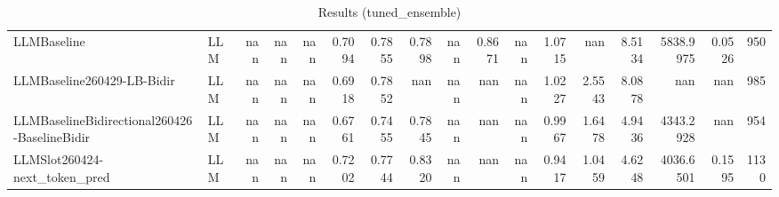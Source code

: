 \begin{table}[htbp]
{\begin{tabular}{ll|rrrrrrrrrrrrrr|r}
LLMBaseline & LLM & nan & nan & nan & 0.7094 & 0.7855 & 0.7898 & nan & 0.8671 & nan & 1.0715 & nan & 8.5134 & 5838.9975 & 0.0526 & 950 \\
LLMBaseline260429-LB-Bidir & LLM & nan & nan & nan & 0.6918 & 0.7852 & nan & nan & nan & nan & 1.0227 & 2.5543 & 8.0878 & nan & nan & 985 \\
LLMBaselineBidirectional260426-BaselineBidir & LLM & nan & nan & nan & 0.6761 & 0.7455 & 0.7845 & nan & nan & nan & 0.9967 & 1.6478 & 4.9436 & 4343.2928 & nan & 954 \\
LLMSlot260424-next\_token\_pred & LLM & nan & nan & nan & 0.7202 & 0.7744 & 0.8320 & nan & nan & nan & 0.9417 & 1.0459 & 4.6248 & 4036.6501 & 0.1595 & 1130 \\
\bottomrule
\end{tabular}
}
\caption{Results (tuned_ensemble)}
\label{tab:results_tuned_ensemble}
\end{table}